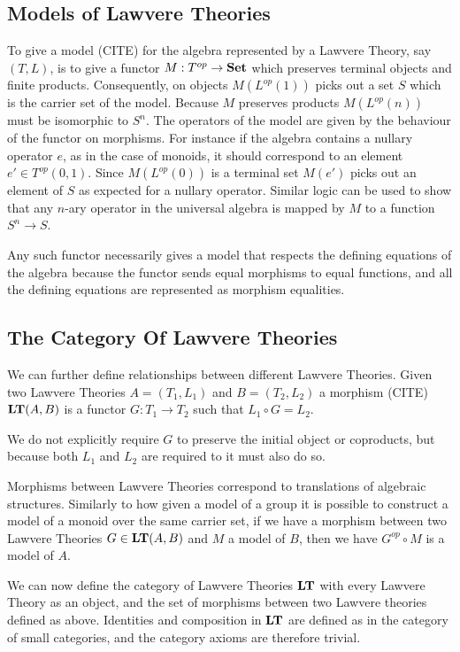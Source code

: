 \subsection{Models of Lawvere Theories}
To give a model (CITE) for the algebra represented by a Lawvere Theory, say $(T,
L)$, is to give a functor $M: T^{op}\to \mathbf{Set}$ which preserves terminal
objects and finite products. Consequently, on objects $M(L^{op}(1))$ picks out a
set $S$ which is the carrier set of the model. Because $M$ preserves products
$M(L^{op}(n))$ must be isomorphic to $S^n$. The operators of the model are given
by the behaviour of the functor on morphisms. For instance if the algebra
contains a nullary operator $e$, as in the case of monoids, it should correspond
to an element $e'\in T^{op}(0,1)$. Since $M(L^{op}(0))$ is a terminal set
$M(e')$ picks out an element of $S$ as expected for a nullary operator.
Similar logic can be used to show that any $n$-ary operator in the universal
algebra is mapped by $M$ to a function $S^n\to S$.

Any such functor necessarily gives a model that respects the defining equations
of the algebra because the functor sends equal morphisms to equal
functions, and all the defining equations are represented as morphism
equalities.

\subsection{The Category Of Lawvere Theories}
We can further define relationships between different Lawvere Theories. Given
two Lawvere Theories $A = (T_1, L_1)$ and $B = (T_2, L_2)$ a morphism (CITE)
$\mathbf{LT}(A, B)$ is a functor $G: T_1\to T_2$ such that $L_1\circ G = L_2$.

We do not explicitly require $G$ to preserve the initial object or coproducts,
but because both $L_1$ and $L_2$ are required to it must also do so.

Morphisms between Lawvere Theories correspond to translations of algebraic
structures. Similarly to how given a model of a group it is possible to
construct a model of a monoid over the same carrier set, if we have a morphism
between two Lawvere Theories $G\in \mathbf{LT}(A, B)$ and $M$ a model of $B$,
then we have $G^{op}\circ M$ is a model of $A$.

We can now define the category of Lawvere Theories $\mathbf{LT}$ with every
Lawvere Theory as an object, and the set of morphisms between two Lawvere
theories defined as above. Identities and composition in $\mathbf{LT}$ are
defined as in the category of small categories, and the category axioms are
therefore trivial.

